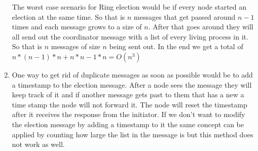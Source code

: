 \documentclass{article}
\begin{document}
\begin{enumerate}
The worst case scenario for Ring election would be if every node started an election at the same time. So that is \(n\) messages that get passed around \(n-1\) times and each message grows to a size of \(n\). After that goes around they will all send out the coordinator message with a list of every living process in it. So that is \(n\) messages of size \(n\) being sent out. In the end we get a total of  \(n*(n-1)*n+n*n-1*n =O(n^3)\)


\item One way to get rid of duplicate messages as soon as possible would be to add a timestamp to the election message. After a node sees the message they will keep track of it and if another message gets past to them that has a new a time stamp the node will not forward it. The node will reset the timestamp after it receives the response from the initiator. If we don’t want to modify the election message by adding a timestamp to it the same concept can be applied by counting how large the list in the message is but this method does not work as well.

\end{enumerate}
\end{document}
